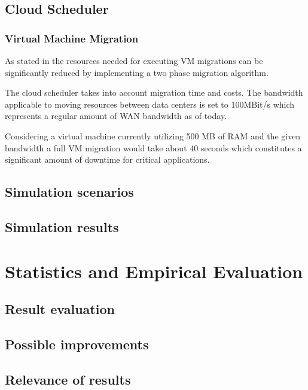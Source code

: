 \subsection{Cloud Scheduler}

\subsubsection{Virtual Machine Migration}

As stated in \cite{celesti2010improving} the resources needed for executing VM migrations can be significantly reduced by implementing a two phase migration algorithm. 

The cloud scheduler takes into account migration time and costs. The bandwidth applicable to moving resources between data centers is set to 100MBit/s which represents a regular amount of WAN bandwidth as of today. 

Considering a virtual machine currently utilizing 500 MB of RAM and the given bandwidth a full VM migration would take about 40 seconds which constitutes a significant amount of downtime for critical applications. 



\subsection{Simulation scenarios}

\subsection{Simulation results}


\section{Statistics and Empirical Evaluation}

\subsection{Result evaluation}

\subsection{Possible improvements}

\subsection{Relevance of results}



